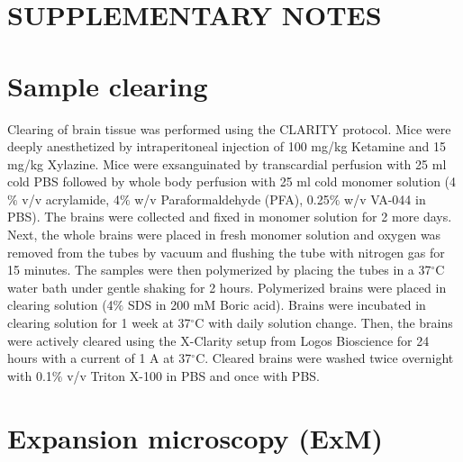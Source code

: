 \section*{SUPPLEMENTARY NOTES}

\hspace{20mm}

\section{Sample clearing}
\label{sec:clearing}

Clearing of brain tissue was performed using the CLARITY protocol\cite{clarity}. Mice were deeply anesthetized by intraperitoneal injection of 100 mg/kg Ketamine and 15 mg/kg Xylazine. Mice were exsanguinated by transcardial perfusion with 25 ml cold PBS followed by whole body perfusion with 25 ml cold monomer solution (4$\%$ v/v acrylamide, 4$\%$ w/v Paraformaldehyde (PFA), 0.25$\%$ w/v VA-044 in PBS). The brains were collected and fixed in monomer solution for 2 more days. Next, the whole brains were placed in fresh monomer solution and oxygen was removed from the tubes by vacuum and flushing the tube with nitrogen gas for 15 minutes. The samples were then polymerized by placing the tubes in a 37${}^\circ$C water bath under gentle shaking for 2 hours. Polymerized brains were placed in clearing solution (4$\%$ SDS in 200 mM Boric acid). Brains were incubated in clearing solution for 1 week at 37${}^\circ$C with daily solution change. Then, the brains were actively cleared using the X-Clarity setup from Logos Bioscience for 24 hours with a current of 1 A at 37${}^\circ$C. Cleared brains were washed twice overnight with 0.1$\%$ v/v Triton X-100 in PBS and once with PBS.


\section{Expansion microscopy (ExM)}
\label{sec:expansion}

